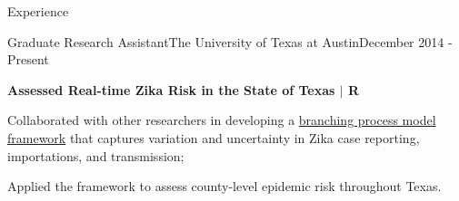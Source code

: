 \documentclass{my_resume} %
\begin{document}
\begin{rSection}{Experience}
\begin{rSubsection}{Graduate Research Assistant}{The University of Texas at
    Austin}{December 2014 - Present}
  \item[] \textbf{Assessed Real-time Zika Risk in the State of Texas $|$ R}
  \item Collaborated with other researchers in developing a \underline{branching
      process model framework} that captures variation and uncertainty in Zika
      case reporting, importations, and transmission;
  \item Applied the framework to assess county-level epidemic risk throughout
    Texas.

  \end{rSubsection}
\end{rSection}

\end{document}
